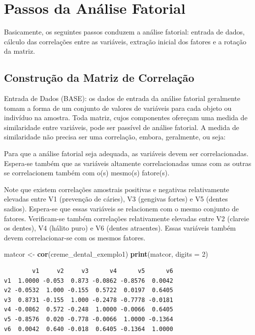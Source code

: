 \documentclass[12pt,brazil,oneside]{book}
\newenvironment{Shaded}{\begin{snugshade}}{\end{snugshade}}
\newcommand{\DataTypeTok}[1]{\textcolor[rgb]{0.13,0.29,0.53}{#1}}
\newcommand{\DecValTok}[1]{\textcolor[rgb]{0.00,0.00,0.81}{#1}}
\newcommand{\KeywordTok}[1]{\textcolor[rgb]{0.13,0.29,0.53}{\textbf{#1}}}
\newcommand{\NormalTok}[1]{#1}
\newcommand{\StringTok}[1]{\textcolor[rgb]{0.31,0.60,0.02}{#1}}
\begin{document}
\hypertarget{passos-da-analise-fatorial}{%
\section{Passos da Análise Fatorial}\label{passos-da-analise-fatorial}}

Basicamente, os seguintes passos conduzem a análise fatorial: entrada de dados, cálculo das correlações entre as variáveis, extração inicial dos fatores e a rotação da matriz.

\hypertarget{construcao-da-matriz-de-correlacao}{%
\subsection{Construção da Matriz de Correlação}\label{construcao-da-matriz-de-correlacao}}

Entrada de Dados (BASE): os dados de entrada da análise fatorial geralmente tomam a forma de um conjunto de valores de variáveis para cada objeto ou indivíduo na amostra. Toda matriz, cujos componentes ofereçam uma medida de similaridade entre variáveis, pode ser passível de análise fatorial. A medida de similaridade não precisa ser uma correlação, embora, geralmente, ou seja:

Para que a análise fatorial seja adequada, as variáveis devem ser correlacionadas. Espera-se também que as variáveis altamente correlacionadas umas com as outras se correlacionem também com o(s) mesmo(s) fatore(s).

Note que existem correlações amostrais positivas e negativas relativamente elevadas entre V1 (prevenção de cáries), V3 (gengivas fortes) e V5 (dentes sadios). Espera-se que essas variáveis se relacionem com o mesmo conjunto de fatores. Verificam-se também correlações relativamente elevadas entre V2 (clareie os dentes), V4 (hálito puro) e V6 (dentes atraentes). Essas variáveis também devem correlacionar-se com os mesmos fatores.

\begin{Shaded}
\begin{Highlighting}[]
\NormalTok{matcor <-}\StringTok{ }\KeywordTok{cor}\NormalTok{(creme_dental_exemplo1)}
\KeywordTok{print}\NormalTok{(matcor, }\DataTypeTok{digits =} \DecValTok{2}\NormalTok{)}
\end{Highlighting}
\end{Shaded}

\begin{verbatim}
        v1     v2     v3      v4      v5      v6
v1  1.0000 -0.053  0.873 -0.0862 -0.8576  0.0042
v2 -0.0532  1.000 -0.155  0.5722  0.0197  0.6405
v3  0.8731 -0.155  1.000 -0.2478 -0.7778 -0.0181
v4 -0.0862  0.572 -0.248  1.0000 -0.0066  0.6405
v5 -0.8576  0.020 -0.778 -0.0066  1.0000 -0.1364
v6  0.0042  0.640 -0.018  0.6405 -0.1364  1.0000
\end{verbatim}
\end{document}
